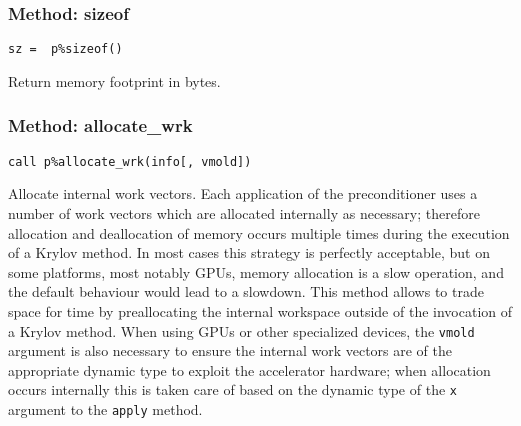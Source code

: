 \subsubsection{Method: sizeof}
  
\begin{center}
\verb|sz =  p%sizeof()|\\
\end{center}

\noindent
Return memory footprint in bytes. 



\subsubsection{Method: allocate\_wrk}
  
\begin{center}
\verb|call p%allocate_wrk(info[, vmold])|\\
\end{center}

\noindent
Allocate internal work vectors. Each application of the preconditioner
uses a number of  work vectors which are allocated internally as
necessary; therefore allocation and deallocation of memory occurs
multiple times during the execution of a Krylov method. In most cases
this strategy is perfectly acceptable, but 
on some platforms, most notably GPUs, memory allocation is
a slow  operation, and the default behaviour would lead to a
slowdown.  This method allows to trade space for time by preallocating 
the internal workspace outside of the invocation of a Krylov
method. When using GPUs or other specialized devices, the \verb|vmold|
argument is also necessary to ensure the internal work vectors are of
the appropriate dynamic type to exploit the accelerator hardware; when
allocation occurs internally this is taken care of based on the dynamic
type of the \verb|x| argument to the \verb|apply| method. 

